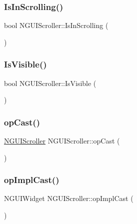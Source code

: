 \subsubsection{\texorpdfstring{Is\+In\+Scrolling()}{IsInScrolling()}}
{\footnotesize\ttfamily bool N\+G\+U\+I\+Scroller\+::\+Is\+In\+Scrolling (\begin{DoxyParamCaption}{ }\end{DoxyParamCaption})}

\hypertarget{class_n_g_u_i_scroller_adb2d7f37d2ebfe5dfffdd82aceeb9d8c}{}\label{class_n_g_u_i_scroller_adb2d7f37d2ebfe5dfffdd82aceeb9d8c} 
\subsubsection{\texorpdfstring{Is\+Visible()}{IsVisible()}}
{\footnotesize\ttfamily bool N\+G\+U\+I\+Scroller\+::\+Is\+Visible (\begin{DoxyParamCaption}{ }\end{DoxyParamCaption})}

\hypertarget{class_n_g_u_i_scroller_a4b73e76568d944720f8f9e8396917b4c}{}\label{class_n_g_u_i_scroller_a4b73e76568d944720f8f9e8396917b4c} 
\subsubsection{\texorpdfstring{op\+Cast()}{opCast()}}
{\footnotesize\ttfamily \hyperlink{class_n_g_u_i_scroller}{N\+G\+U\+I\+Scroller} N\+G\+U\+I\+Scroller\+::op\+Cast (\begin{DoxyParamCaption}{ }\end{DoxyParamCaption})}

\hypertarget{class_n_g_u_i_scroller_aedfa64a01cefe036c5d48fdb7c3dd671}{}\label{class_n_g_u_i_scroller_aedfa64a01cefe036c5d48fdb7c3dd671} 
\subsubsection{\texorpdfstring{op\+Impl\+Cast()}{opImplCast()}}
{\footnotesize\ttfamily N\+G\+U\+I\+Widget N\+G\+U\+I\+Scroller\+::op\+Impl\+Cast (\begin{DoxyParamCaption}{ }\end{DoxyParamCaption})}

